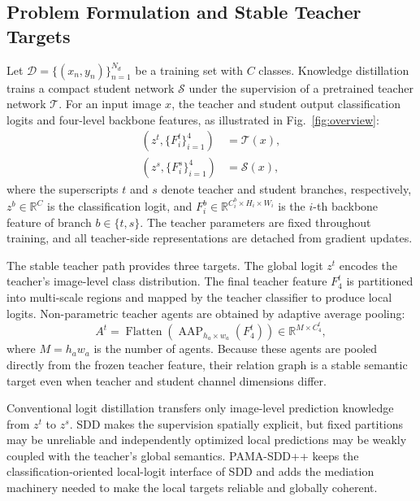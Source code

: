 \documentclass[a4paper,fleqn]{cas-dc}
\begin{document}
\subsection{Problem Formulation and Stable Teacher Targets}

Let $\mathcal{D}=\{(x_n,y_n)\}_{n=1}^{N_d}$ be a training set with $C$
classes. Knowledge distillation trains a compact student network
$\mathcal{S}$ under the supervision of a pretrained teacher network
$\mathcal{T}$. For an input image $x$, the teacher and student output
classification logits and four-level backbone features, as illustrated in
Fig.~\ref{fig:overview}:
\begin{equation}
\begin{split}
    (z^{t},\{F_i^{t}\}_{i=1}^{4})&=\mathcal{T}(x),\\
    (z^{s},\{F_i^{s}\}_{i=1}^{4})&=\mathcal{S}(x),
\end{split}
\label{eq:problem_formulation}
\end{equation}
where the superscripts $t$ and $s$ denote teacher and student branches,
respectively, $z^b\in\mathbb{R}^{C}$ is the classification logit, and
$F_i^b\in\mathbb{R}^{C_i^b\times H_i\times W_i}$ is the $i$-th backbone
feature of branch $b\in\{t,s\}$. The teacher parameters are fixed throughout
training, and all teacher-side representations are detached from gradient
updates.

The stable teacher path provides three targets. The global logit $z^t$
encodes the teacher's image-level class distribution. The final teacher
feature $F_4^t$ is partitioned into multi-scale regions and mapped by the
teacher classifier to produce local logits. Non-parametric teacher agents are
obtained by adaptive average pooling:
\begin{equation}
    A^{t}=\operatorname{Flatten}\left(
    \operatorname{AAP}_{h_a\times w_a}(F_4^t)\right)
    \in\mathbb{R}^{M\times C_4^t},
\label{eq:teacher_agents}
\end{equation}
where $M=h_aw_a$ is the number of agents. Because these agents are pooled
directly from the frozen teacher feature, their relation graph is a stable
semantic target even when teacher and student channel dimensions differ.

Conventional logit distillation transfers only image-level prediction
knowledge from $z^t$ to $z^s$. SDD makes the supervision spatially explicit,
but fixed partitions may be unreliable and independently optimized local
predictions may be weakly coupled with the teacher's global semantics.
PAMA-SDD++ keeps the classification-oriented local-logit interface of SDD and
adds the mediation machinery needed to make the local targets reliable and
globally coherent.
\end{document}
